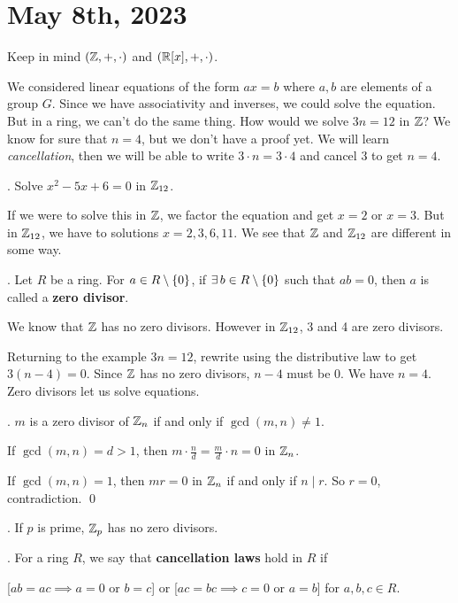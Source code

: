 \section*{May 8th, 2023}


Keep in mind \((\mathbb{Z}, +, \cdot)\) and \((\mathbb{R}[x], +, \cdot)\).

We considered linear equations of the form \(ax=b\) where \(a, b\) are elements of a group \(G\). Since we have associativity and inverses, we could solve the equation. But in a ring, we can't do the same thing. How would we solve \(3n = 12\) in \(\mathbb{Z}\)? We know for sure that \(n = 4\), but we don't have a proof yet. We will learn \textit{cancellation}, then we will be able to write \(3 \cdot n = 3 \cdot 4\) and cancel 3 to get \(n = 4\).

\ex. Solve \(x^2 - 5x + 6 = 0\) in \(\mathbb{Z}_{12}\).

\rmk If we were to solve this in \(\mathbb{Z}\), we factor the equation and get \(x = 2\) or \(x = 3\). But in \(\mathbb{Z}_{12}\), we have to solutions \(x = 2, 3, 6, 11\). We see that \(\mathbb{Z}\) and \(\mathbb{Z}_{12}\) are different in some way.

.  Let \(R\) be a ring. For \(a \in R \setminus \{0\}\), if \(\exists b \in R \bs \{0\}\) such that \(ab = 0\), then \(a\) is called a \textbf{zero divisor}.

\rmk We know that \(\mathbb{Z}\) has no zero divisors. However in \(\mathbb{Z}_{12}\), 3 and 4 are zero divisors.

Returning to the example \(3n = 12\), rewrite using the distributive law to get \(3(n - 4) = 0\). Since \(\mathbb{Z}\) has no zero divisors, \(n - 4\) must be 0. We have \(n = 4\). Zero divisors let us solve equations.

\thm. \(m\) is a zero divisor of \(\mathbb{Z}_n\) if and only if \(\gcd(m, n) \neq 1\).

\pf \note{\mimpd} If \(\gcd(m, n) = d > 1\), then \(m \cdot \frac{n}{d} = \frac{m}{d}\cdot n = 0\) in \(\mathbb{Z}_n\).

\note{\mimp} If \(\gcd(m, n) = 1\), then \(mr = 0\) in \(\mathbb{Z}_n\) if and only if \(n \mid r\). So \(r = 0\), contradiction. \qed

\cor. If \(p\) is prime, \(\mathbb{Z}_p\) has no zero divisors.

.  For a ring \(R\), we say that \textbf{cancellation laws} hold in \(R\) if
\begin{center}
    [\(ab = ac \implies a = 0\) or \(b = c\)] or [\(ac = bc \implies c = 0\) or \(a = b\)] for \(a, b, c \in R\).
\end{center}

